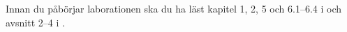Innan du påbörjar laborationen ska du ha läst kapitel 1, 2, 5 och 6.1--6.4 
i \cite{Brookshear2012csa} och avsnitt 2--4 i \cite{pythonkramaren1}.
